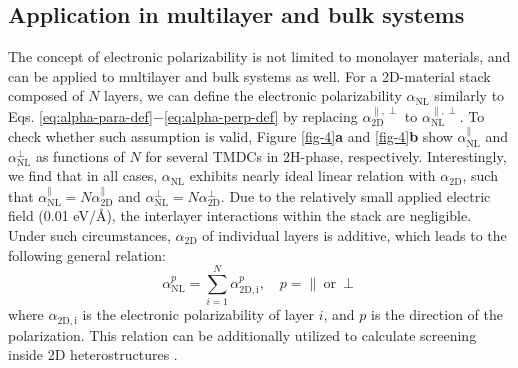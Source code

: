 \documentclass[journal=ancac3,manuscript=article,email=true,hyperref=true,keywords=false]{achemso}
\begin{document}
\subsection{Application in multilayer and bulk systems}
\label{sec:apply-electr-polar}
%
%
The concept of electronic polarizability is not limited to monolayer
materials, and can be applied to multilayer and bulk systems as
well. For a 2D-material stack composed of $N$ layers, we can define
the electronic polarizability $\alpha_{\mathrm{NL}}$ similarly to
Eqs. \ref{eq:alpha-para-def}$-$\ref{eq:alpha-perp-def} by replacing 
$\alpha_{\mathrm{2D}}^{\parallel,\perp}$ to $\alpha_{\mathrm{NL}}^{\parallel,\perp}$. 
%
%
To check whether such assumption is valid, 
Figure \ref{fig-4}\textbf{a} and \ref{fig-4}\textbf{b} show
$\alpha_{\mathrm{NL}}^{\parallel}$ and $\alpha_{\mathrm{NL}}^{\perp}$
as functions of $N$ for several TMDCs in 2H-phase, 
respectively. Interestingly, we find that in all cases,
$\alpha_{\mathrm{NL}}$ exhibits nearly ideal linear relation with
$\alpha_{\mathrm{2D}}$, such that
$\alpha_{\mathrm{NL}}^{\parallel}= N \alpha_{\mathrm{2D}}^{\parallel}$
and $\alpha_{\mathrm{NL}}^{\perp}= N
\alpha_{\mathrm{2D}}^{\perp}$. Due to the relatively small
applied electric field (0.01 eV/\AA{}), the interlayer interactions within
the stack are negligible. Under such circumstances, 
$\alpha_{\mathrm{2D}}$ of individual layers is additive, 
which leads to the following general relation: 
%
\begin{equation}
  \label{eq:alpha-nl}
  \alpha_{\mathrm{NL}}^{p} = \sum_{i=1}^{N} \alpha_{\mathrm{2D, i}}^{p},\quad p=\parallel\ \mathrm{or}\ \perp
\end{equation}
where $\alpha_{\mathrm{2D, i}}$ is the electronic polarizability of
layer $i$, and $p$ is the direction of the polarization. This relation can
be additionally utilized to calculate screening inside 2D heterostructures
\cite{Kumar_2016_jpcc,Andersen_2015_dielec_vdWH}.
%
%
%
\end{document}
